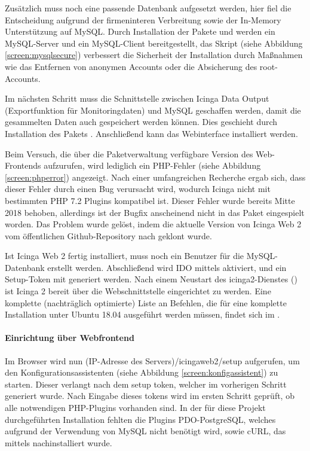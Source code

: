 Zusätzlich muss noch eine passende Datenbank aufgesetzt werden, hier fiel die Entscheidung aufgrund der firmeninteren Verbreitung sowie der In-Memory Unterstützung auf MySQL. Durch Installation der Pakete  und  werden ein MySQL-Server und ein MySQL-Client bereitgestellt, das Skript  (siehe Abbildung \ref{screen:mysqlsecure}) verbessert die Sicherheit der Installation durch Maßnahmen wie das Entfernen von anonymen Accounts oder die Absicherung des root-Accounts.

Im nächsten Schritt muss die Schnittstelle zwischen \glqq{}Icinga Data Output\grqq{} (Exportfunktion für Monitoringdaten) und MySQL geschaffen werden, damit die gesammelten Daten auch gespeichert werden können. Dies geschieht durch Installation des Pakets . Anschließend kann das Webinterface  installiert werden.

Beim Versuch, die über die Paketverwaltung verfügbare Version des Web-Frontends aufzurufen, wird lediglich ein PHP-Fehler (siehe Abbildung \ref{screen:phperror}) angezeigt. Nach einer umfangreichen Recherche ergab sich, dass dieser Fehler durch einen Bug verursacht wird, wodurch \glqq{}Icinga\grqq{} nicht mit bestimmten PHP 7.2 Plugins kompatibel ist. Dieser Fehler wurde bereits Mitte 2018 behoben, allerdings ist der Bugfix anscheinend nicht in das Paket eingespielt worden. Das Problem wurde gelöst, indem die aktuelle Version von \glqq{}Icinga Web 2\grqq{} vom öffentlichen Github-Repository nach  geklont wurde.

Ist \glqq{}Icinga Web 2\grqq{} fertig installiert, muss noch ein Benutzer für die MySQL-Datenbank erstellt werden. Abschließend wird IDO mittels  aktiviert, und ein Setup-Token mit  generiert werden. Nach einem Neustart des icinga2-Dienstes () ist \glqq{}Icinga 2\grqq{} bereit über die Webschnittstelle eingerichtet zu werden. Eine komplette (nachträglich optimierte) Liste an Befehlen, die für eine komplette Installation unter Ubuntu 18.04 ausgeführt werden müssen, findet sich im .

\paragraph{Einrichtung über Webfrontend}
Im Browser wird nun (IP-Adresse des Servers)/icingaweb2/setup aufgerufen, um den Konfigurationsassistenten (siehe Abbildung \ref{screen:konfigassistent}) zu starten. Dieser verlangt nach dem setup token, welcher im vorherigen Schritt generiert wurde. Nach Eingabe dieses tokens wird im ersten Schritt geprüft, ob alle notwendigen PHP-Plugins vorhanden sind. In der für diese Projekt durchgeführten Installation fehlten die Plugins \glqq{}PDO-PostgreSQL\grqq{}, welches aufgrund der Verwendung von MySQL nicht benötigt wird, sowie \glqq{}cURL\grqq{}, das mittels  nachinstalliert wurde.

